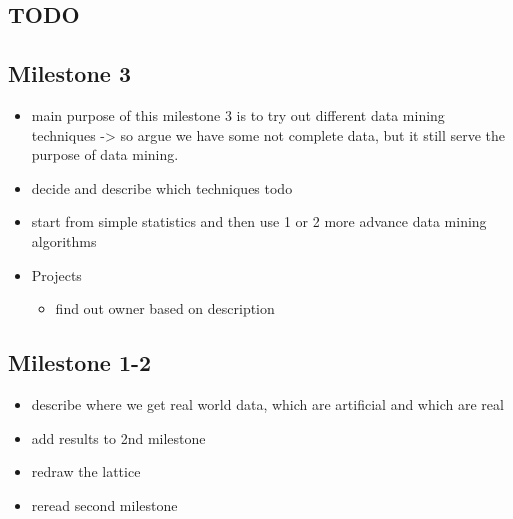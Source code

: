 \subsection{TODO} %
\label{sub:TODO}

\subsection{Milestone 3} %
\label{sub:Milestone 3}
\begin{itemize}
    \item main purpose of this milestone 3 is to try out different data mining techniques -> so argue we have some not complete data, but it still serve the purpose of data mining.
    \item decide and describe which techniques todo
    \item start from simple statistics and then use 1 or 2 more advance data mining algorithms
    \item Projects
        \begin{itemize}
            \item find out owner based on description 
        \end{itemize}
\end{itemize}


\subsection{Milestone 1-2} %
\label{sub:Milestone 1-2}

\begin{itemize}
    \item describe where we get real world data, which are artificial and which are real
    \item add results to 2nd milestone
    \item redraw the lattice
    \item reread second milestone
\end{itemize}

